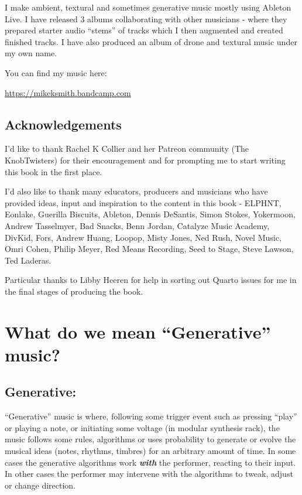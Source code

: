 \documentclass[
  12pt,
  letterpaper,
  oneside,
  open=any]{scrbook}
\begin{document}
I make ambient, textural and sometimes generative music mostly using
Ableton Live. I have released 3 albums collaborating with other
musicians - where they prepared starter audio ``stems'' of tracks which
I then augmented and created finished tracks. I have also produced an
album of drone and textural music under my own name.

You can find my music here:

\url{https://mikeksmith.bandcamp.com}

\section*{Acknowledgements}\label{acknowledgements}


I'd like to thank Rachel K Collier and her Patreon community (The
KnobTwisters) for their encouragement and for prompting me to start
writing this book in the first place.

I'd also like to thank many educators, producers and musicians who have
provided ideas, input and inspiration to the content in this book -
ELPHNT, Eonlake, Guerilla Biscuits, Ableton, Dennis DeSantis, Simon
Stokes, Yokermoon, Andrew Tasselmyer, Bad Snacks, Benn Jordan, Catalyze
Music Academy, DivKid, Fors, Andrew Huang, Loopop, Misty Jones, Ned
Rush, Novel Music, Omri Cohen, Philip Meyer, Red Means Recording, Seed
to Stage, Steve Lawson, Ted Laderas.

Particular thanks to Libby Heeren for help in sorting out Quarto issues
for me in the final stages of producing the book.


\chapter{What do we mean ``Generative''
music?}\label{0000-Defintion-Generative}

\section*{Generative:}\label{generative}


``Generative'' music is where, following some trigger event such as
pressing ``play'' or playing a note, or initiating some voltage (in
modular synthesis rack), the music follows some rules, algorithms or
uses probability to generate or evolve the musical ideas (notes,
rhythms, timbres) for an arbitrary amount of time. In some cases the
generative algorithms work \textbf{\emph{with}} the performer, reacting
to their input. In other cases the performer may intervene with the
algorithms to tweak, adjust or change direction.
\end{document}
